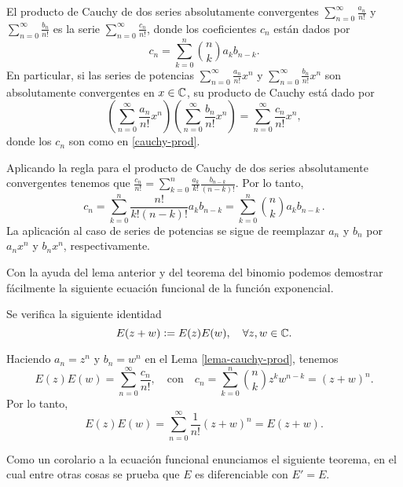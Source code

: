  \begin{lemma} \label{lema-cauchy-prod}
    El producto de Cauchy de dos series absolutamente convergentes $\displaystyle\sum_{n=0}^{\infty} \frac{a_n}{n!}$
    y $\displaystyle\sum_{n=0}^{\infty} \frac{b_n}{n!}$ es la serie $\displaystyle\sum_{n=0}^{\infty} \frac{c_n}{n!}$,
    donde los coeficientes $c_n$ están dados por
    \begin{equation}\label{cauchy-prod}
    \displaystyle c_n = \sum_{k=0}^{n} \binom{n}{k}a_kb_{n-k}.
    \end{equation}
    En particular, si las series de potencias $\displaystyle\sum_{n=0}^{\infty} \frac{a_n}{n!}x^n$ y 
    $\displaystyle\sum_{n=0}^{\infty} \frac{b_n}{n!}x^n$ son absolutamente convergentes en $x\in \mathbb{C}$,
    su producto de Cauchy está dado por
    \begin{equation*}
        \displaystyle \left(\sum_{n=0}^{\infty} \frac{a_n}{n!}x^n \right) \left(\sum_{n=0}^{\infty} \frac{b_n}{n!}x^n\right) = 
        \sum_{n=0}^{\infty} \frac{c_n}{n!}x^n,
    \end{equation*}
    donde los $c_n$ son como en \eqref{cauchy-prod}.
  \end{lemma}
  \begin{dem}
    Aplicando la regla para el producto de Cauchy de dos series absolutamente convergentes tenemos que 
    $\displaystyle \frac{c_n}{n!} = \sum_{k=0}^{n} \frac{a_k}{k!}\frac{b_{n-k}}{(n-k)!}$. Por lo tanto,
    \[
    c_n = \sum_{k=0}^{n} \frac{n!}{k!(n-k)!} a_k b_{n-k} = \sum_{k=0}^{n}\binom{n}{k} a_k b_{n-k} \, .
    \]
    La aplicación al caso de series de potencias se sigue de reemplazar $a_n$ y $b_n$ por $a_nx^n$ y $b_nx^n$,
    respectivamente.
  \end{dem}
  Con la ayuda del lema anterior y del teorema del binomio podemos demostrar fácilmente la siguiente ecuación
  funcional de la función exponencial.
  \begin{theo} Se verifica la siguiente identidad
    \begin{equation}
        E(z+w) \vcentcolon = E(z)E(w), \quad \forall z,w \in \mathbb{C}.
    \end{equation}
    \begin{dem}
        Haciendo $a_n = z^n$ y $b_n = w^n$ en el Lema \ref{lema-cauchy-prod}, tenemos
        \[
        E(z)E(w) = \sum_{n=0}^{\infty} \frac{c_n}{n!}, \quad \text{con} \quad 
        c_n = \sum_{k=0}^{n} \binom{n}{k}z^k w^{n-k} = (z+w)^n. 
        \]
        Por lo tanto,
        \[
        E(z)E(w) = \sum_{n=0}^{\infty} \frac{1}{n!}(z+w)^n = E(z+w).
        \]
    \end{dem}
  \end{theo}
Como un corolario a la ecuación funcional enunciamos el siguiente teorema, en el cual entre otras cosas
se prueba que $E$ es diferenciable con $E'= E$. 

